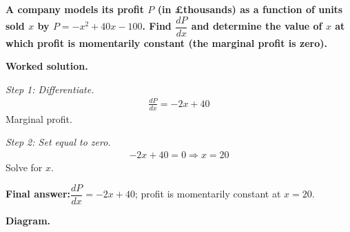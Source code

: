 \documentclass[11pt]{article}
\newcommand{\question}[1]{\par\medskip\noindent\textbf{#1}\par}
\begin{document}
\question{A company models its profit \( P \) (in \pounds thousands) as a function of units sold \( x \) by \( P = -x^2 + 40x - 100 \). Find \( \dfrac{dP}{dx} \) and determine the value of \( x \) at which profit is momentarily constant (the marginal profit is zero).}

\textbf{Worked solution.}

\textit{Step 1: Differentiate.}
\[\begin{gathered}
\frac{dP}{dx} = -2x + 40
\end{gathered}\]
Marginal profit.

\textit{Step 2: Set equal to zero.}
\[\begin{gathered}
-2x + 40 = 0 \Rightarrow x = 20
\end{gathered}\]
Solve for \( x \).

\begin{answerbox}
\textbf{Final answer:}\quad \(\displaystyle  \dfrac{dP}{dx} = -2x + 40 \); profit is momentarily constant at \(\displaystyle  x = 20 \).
\end{answerbox}
\textbf{Diagram.}
\end{document}
